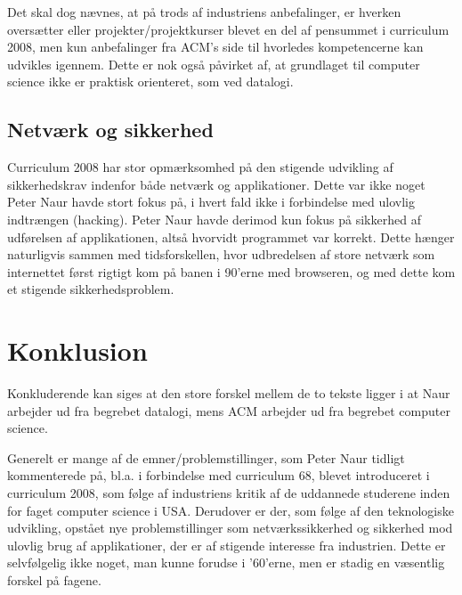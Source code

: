 \documentclass[10pt,a4paper]{article}
\begin{document}
Det skal dog nævnes, at på trods af industriens anbefalinger, er hverken
oversætter eller projekter/projektkurser blevet en del af pensummet i curriculum
2008, men kun anbefalinger fra ACM's side til hvorledes kompetencerne kan
udvikles igennem. Dette er nok også påvirket af, at grundlaget til computer
science ikke er praktisk orienteret, som ved datalogi.

\subsection{Netværk og sikkerhed}
Curriculum 2008 har stor opmærksomhed på den stigende udvikling af
sikkerhedskrav indenfor både netværk og applikationer. Dette var ikke noget
Peter Naur havde stort fokus på, i hvert fald ikke i forbindelse med ulovlig
indtrængen (hacking). Peter Naur havde derimod kun fokus på sikkerhed af
udførelsen af applikationen, altså hvorvidt programmet var korrekt. Dette hænger
naturligvis sammen med tidsforskellen, hvor udbredelsen af store netværk som
internettet først rigtigt kom på banen i 90'erne med browseren, og med dette kom
et stigende sikkerhedsproblem.

\section{Konklusion}
Konkluderende kan siges at den store forskel mellem de to tekste ligger i at
Naur arbejder ud fra begrebet datalogi, mens ACM arbejder ud fra begrebet
computer science. 

Generelt er mange af de emner/problemstillinger, som Peter Naur tidligt
kommenterede på, bl.a. i forbindelse med curriculum 68, blevet introduceret
i curriculum 2008, som følge af industriens kritik af de uddannede studerene
inden for faget computer science i USA.
Derudover er der, som følge af den teknologiske udvikling, opstået nye
problemstillinger som netværkssikkerhed og sikkerhed mod ulovlig brug af
applikationer, der er af stigende interesse fra industrien. Dette er
selvfølgelig ikke noget, man kunne forudse i '60'erne, men er stadig en
væsentlig forskel på fagene.
\end{document}
